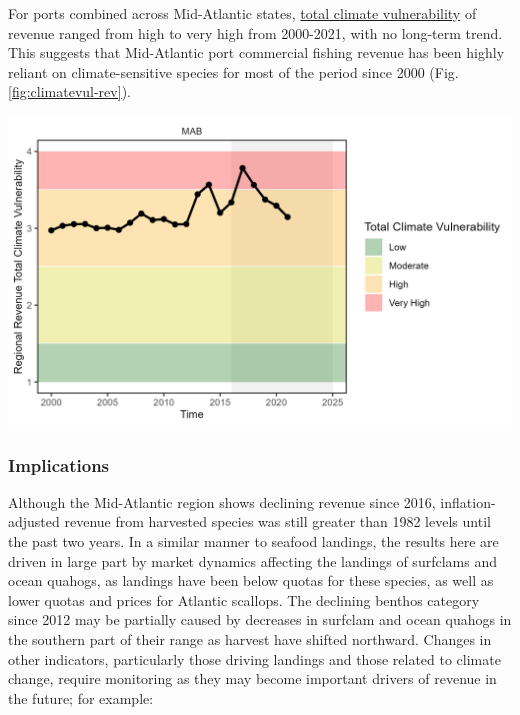 \documentclass[
  10pt,
]{article}
\let\origfigure\figure
\let\endorigfigure\endfigure
\renewenvironment{figure}[1][2] {
    \expandafter\origfigure\expandafter[H]
} {
    \endorigfigure
}
\begin{document}
For ports combined across Mid-Atlantic states, \href{https://noaa-edab.github.io/catalog/community_climate_vulnerability.html}{total climate vulnerability} of revenue ranged from high to very high from 2000-2021, with no long-term trend. This suggests that Mid-Atlantic port commercial fishing revenue has been highly reliant on climate-sensitive species for most of the period since 2000 (Fig. \ref{fig:climatevul-rev}).

\begin{figure}

{\centering \includegraphics[width=6.5in]{images/MidAtlantic/climatevul_rev_MidAtlantic_2025-09-05} 

}

\caption{Mid-Atlantic region total climate vulnerability of commercial revenue (sum of Mid-Atlantic port revenue weighted by species climate vulnerability from Hare et al. 2016).}\label{fig:climatevul-rev}
\end{figure}

\subsubsection{Implications}\label{implications-2}

Although the Mid-Atlantic region shows declining revenue since 2016, inflation-adjusted revenue from harvested species was still greater than 1982 levels until the past two years. In a similar manner to seafood landings, the results here are driven in large part by market dynamics affecting the landings of surfclams and ocean quahogs, as landings have been below quotas for these species, as well as lower quotas and prices for Atlantic scallops. The declining benthos category since 2012 may be partially caused by decreases in surfclam and ocean quahogs in the southern part of their range as harvest have shifted northward. Changes in other indicators, particularly those driving landings and those related to climate change, require monitoring as they may become important drivers of revenue in the future; for example:
\end{document}
